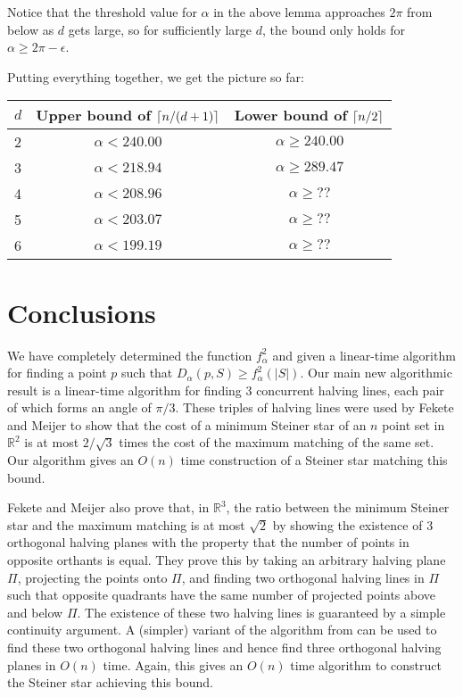 \documentclass[lotsofwhite]{patmorin}
\newcommand{\R}{\mathbb{R}}
\begin{document}
{Notice that the threshold value for $\alpha$ in the above lemma
approaches $2\pi$ from below as $d$ gets large, so for sufficiently
large $d$, the bound only holds for $\alpha \ge 2\pi -\epsilon$.

Putting everything together, we get the picture so far:

\begin{tabular}{l|cc}
$d$ & Upper bound of $\left\lceil n/(d+1) \right\rceil$ & Lower bound of $\left\lceil n/2 \right\rceil$ \\
\hline
2 & $\alpha < 240.00$ & $\alpha \ge 240.00$ \\
3 & $\alpha < 218.94$ & $\alpha \ge 289.47$ \\
4 & $\alpha < 208.96$ & $\alpha \ge ??$ \\
5 & $\alpha < 203.07$ & $\alpha \ge ??$ \\
6 & $\alpha < 199.19$ & $\alpha \ge ??$ \\
\end{tabular}
}





\section{Conclusions}

We have completely determined the function $f^2_\alpha$ and given a
linear-time algorithm for finding a point $p$ such that
$D_\alpha(p,S)\ge f^2_\alpha(|S|)$.  
Our main new algorithmic result is a linear-time algorithm for finding
3 concurrent halving lines, each pair of which forms an angle of
$\pi/3$.  These triples of halving lines were used by Fekete and
Meijer \cite{fm00}
to show that the cost of a minimum Steiner star of an $n$ point
set in $\R^2$ is at most $2/\sqrt{3}$ times the cost of the
maximum matching of the same set.  Our algorithm gives an $O(n)$ time
construction of a Steiner star matching this bound.  

Fekete and Meijer also prove that, in $\R^3$, the ratio
between the minimum Steiner star and the maximum matching is at most
$\sqrt{2}$ by showing the existence of 3 orthogonal halving planes
with the property that the number of points in opposite orthants is
equal.  They prove this by taking an arbitrary halving plane $\Pi$,
projecting the points onto $\Pi$, and finding two orthogonal halving
lines in $\Pi$ such that opposite quadrants have the same number of
projected points above and below $\Pi$. The existence of these two
halving lines is guaranteed by a simple continuity argument.   A
(simpler) variant of the algorithm from  can be
used to find these two orthogonal halving lines and hence find three
orthogonal halving planes in $O(n)$ time.  Again, this gives an $O(n)$
time algorithm to construct the Steiner star achieving this bound.
\end{document}
